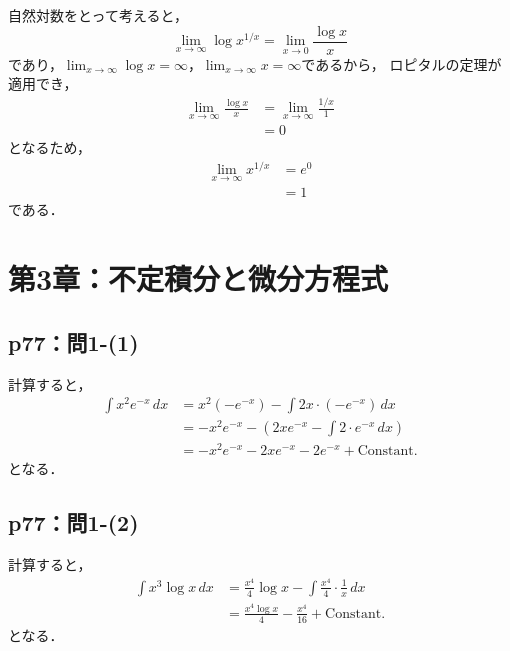 \documentclass[uplatex,dvipdfmx,a4paper,10pt,fleqn]{jsarticle}
\begin{document}
    \begin{tleftbar}
        自然対数をとって考えると，
        \[
            \lim_{x \to \infty} \log x^{1/x}  = \lim_{x \to 0} \frac{\log x}{x} 
        \]
        であり，$\lim_{x \to \infty} \log x = \infty$，$\lim_{x \to \infty} x = \infty$であるから，
        ロピタルの定理が適用でき，
        \begin{align*} 
            \lim_{x \to \infty} \frac{\log x}{x}  & = \lim_{ x \to \infty} \frac{1/x}{1} \\
            & = 0 
        \end{align*} 
        となるため，
        \begin{align*}
            \lim_{x \to \infty} x^{1/x} &= e^0  \\
            & =1 
        \end{align*}
        である．
    \end{tleftbar}

\section*{第3章：不定積分と微分方程式}


\subsection*{p77：問1-(1)}

\begin{tleftbar}
    計算すると，
    \begin{align*} 
       \int  x^2 e^{-x} \, dx & = x^2 (-e^{-x})-\int 2x \cdot (-e^{-x})\, dx \\
       & =-x^2 e^{-x} -\left (2xe^{-x}-\int 2 \cdot e^{-x} \, dx \right) \\
       & = -x^2 e^{-x} - 2xe^{-x} -2e^{-x}+\mathrm{Constant.}
    \end{align*} 
    となる．
\end{tleftbar}


\subsection*{p77：問1-(2)}



\begin{tleftbar}
    計算すると，
    \begin{align*} 
       \int  x^3 \log x \, dx & = \frac{x^4}{4} \log x - \int \frac{x^4}{4} \cdot \frac{1}{x} \, dx \\
       & = \frac{x^4\log x}{4} - \frac{x^4}{16} + \mathrm{Constant.}
    \end{align*}
        となる．
\end{tleftbar}
\end{document}
